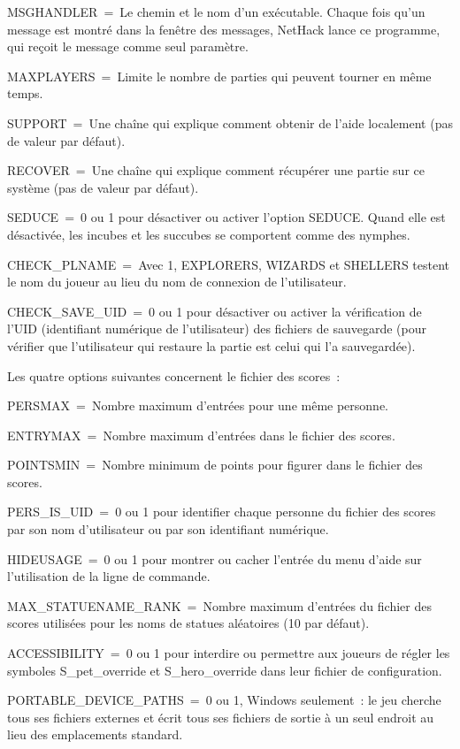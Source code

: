 \documentclass[titlepage]{article}
\begin{document}
MSGHANDLER~=~Le chemin et le nom d'un exécutable.
Chaque fois qu'un message est montré dans la fenêtre des messages, NetHack
lance ce programme, qui reçoit le message comme seul paramètre.


MAXPLAYERS~=~Limite le nombre de parties qui peuvent tourner en même
temps.


SUPPORT~=~Une chaîne qui explique comment obtenir de l'aide localement
(pas de valeur par défaut).


RECOVER~=~Une chaîne qui explique comment récupérer une partie sur ce
système (pas de valeur par défaut).


SEDUCE~=~0 ou 1 pour désactiver ou activer l'option SEDUCE.
Quand elle est désactivée, les incubes et les succubes se comportent comme
des nymphes.


CHECK\_PLNAME~=~Avec 1, EXPLORERS, WIZARDS et SHELLERS testent le nom du
joueur au lieu du nom de connexion de l'utilisateur.


CHECK\_SAVE\_UID~=~0 ou 1 pour désactiver ou activer la vérification de
l'UID (identifiant numérique de l'utilisateur) des fichiers de sauvegarde
(pour vérifier que l'utilisateur qui restaure la partie est celui qui l'a
sauvegardée).


Les quatre options suivantes concernent le fichier des scores~:




PERSMAX~=~Nombre maximum d'entrées pour une même personne.


ENTRYMAX~=~Nombre maximum d'entrées dans le fichier des scores.


POINTSMIN~=~Nombre minimum de points pour figurer dans le fichier des
scores.


PERS\_IS\_UID~=~0 ou 1 pour identifier chaque personne du fichier des
scores par son nom d'utilisateur ou par son identifiant numérique.


HIDEUSAGE~=~0 ou 1 pour montrer ou cacher l'entrée du menu d'aide sur
l'utilisation de la ligne de commande.


MAX\_STATUENAME\_RANK~=~Nombre maximum d'entrées du fichier des scores
utilisées pour les noms de statues aléatoires (10 par défaut).


ACCESSIBILITY~=~0 ou 1 pour interdire ou permettre aux joueurs de régler
les symboles S\_pet\_override et S\_hero\_override dans leur fichier de
configuration.


PORTABLE\_DEVICE\_PATHS~=~0 ou 1, Windows seulement~: le jeu cherche
tous ses fichiers externes et écrit tous ses fichiers de sortie à un seul
endroit au lieu des emplacements standard.
\end{document}
